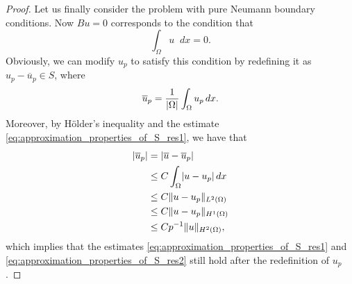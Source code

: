 \documentclass[english, 12pt, a4paper, sci, utf8, a-2b, online]{aaltothesis}
\theoremstyle{definition}
\theoremstyle{plain}
\DeclarePairedDelimiter\abs{\lvert}{\rvert}
\DeclarePairedDelimiter\norm{\lVert}{\rVert}
\newcommand*\diff{\mathop{}\!d}
\numberwithin{equation}{section}
\begin{document}
\begin{proof}
    Let us finally consider the problem with pure Neumann boundary conditions.
    Now $Bu=0$ corresponds to the condition that
    \begin{equation*}
        \int_{\Omega} u \diff x = 0.
    \end{equation*}
    Obviously, we can modify $u_p$ to satisfy this condition by redefining
    it as $u_p - \overline{u}_p \in S$, where
    \begin{equation*}
        \overline{u}_p = \frac{1}{\abs{\Omega}} \int_{\Omega} u_p \diff x.
    \end{equation*}
    Moreover, by Hölder's inequality and the estimate
    \eqref{eq:approximation_properties_of_S_res1}, we have that
    \begin{align*}
        \abs{\overline{u}_p}
        &= \abs{\overline{u} - \overline{u}_p} \\
        &\leq C \int_{\Omega} \abs{u - u_p} \diff x \\
        &\leq C \norm{u - u_p}_{L^2(\Omega)} \\
        &\leq C \norm{u - u_p}_{H^1(\Omega)} \\
        &\leq C p^{-1} \norm{u}_{H^2(\Omega)},
    \end{align*}
    which implies that the estimates \eqref{eq:approximation_properties_of_S_res1}
    and \eqref{eq:approximation_properties_of_S_res2} still hold
    after the redefinition of $u_p$.
\end{proof}
\end{document}
